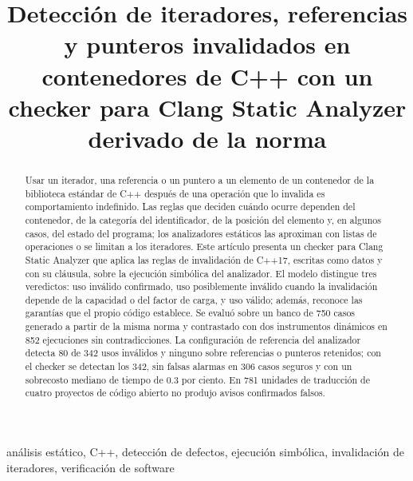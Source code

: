 \documentclass[conference]{IEEEtran}
\begin{document}
\title{Detección de iteradores, referencias y punteros invalidados en contenedores de C++ con un checker para Clang Static Analyzer derivado de la norma}

\author{
\and
{}
}

\maketitle

\begin{abstract}
Usar un iterador, una referencia o un puntero a un elemento de un contenedor de la biblioteca estándar de C++ después de una operación que lo invalida es comportamiento indefinido. Las reglas que deciden cuándo ocurre dependen del contenedor, de la categoría del identificador, de la posición del elemento y, en algunos casos, del estado del programa; los analizadores estáticos las aproximan con listas de operaciones o se limitan a los iteradores. Este artículo presenta un checker para Clang Static Analyzer que aplica las reglas de invalidación de C++17, escritas como datos y con su cláusula, sobre la ejecución simbólica del analizador. El modelo distingue tres veredictos: uso inválido confirmado, uso posiblemente inválido cuando la invalidación depende de la capacidad o del factor de carga, y uso válido; además, reconoce las garantías que el propio código establece. Se evaluó sobre un banco de 750 casos generado a partir de la misma norma y contrastado con dos instrumentos dinámicos en 852 ejecuciones sin contradicciones. La configuración de referencia del analizador detecta 80 de 342 usos inválidos y ninguno sobre referencias o punteros retenidos; con el checker se detectan los 342, sin falsas alarmas en 306 casos seguros y con un sobrecosto mediano de tiempo de 0.3 por ciento. En 781 unidades de traducción de cuatro proyectos de código abierto no produjo avisos confirmados falsos.
\end{abstract}

\begin{IEEEkeywords}
análisis estático, C++, detección de defectos, ejecución simbólica, invalidación de iteradores, verificación de software
\end{IEEEkeywords}
\end{document}
